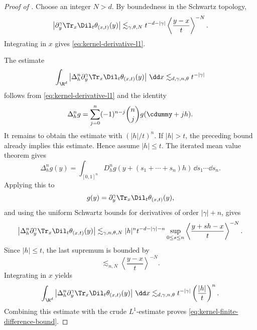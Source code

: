 \begin{proof}[Proof of ]
  Choose an integer \(N > d\). By boundedness in the Schwartz topology,
  \[
    \left|
      \partial_y^{\gamma}
      \Tr_x \Dil_t \theta_{(x, t)}(y)
    \right|
    \lesssim_{\gamma, \theta, N}
    t^{-d - |\gamma|}
    \left\langle \frac{y - x}{t} \right\rangle^{-N}.
  \]
  Integrating in \(x\) gives \eqref{eq:kernel-derivative-l1}.

  The estimate
  \[
    \int_{\R^d}
    \left|
      \Delta_h^n
      \partial_y^{\gamma}
      \Tr_x \Dil_t \theta_{(x, t)}(y)
    \right|
    \, \dd x
    \lesssim_{d, \gamma, n, \theta}
    t^{-|\gamma|}
  \]
  follows from \eqref{eq:kernel-derivative-l1} and the identity
  \[
    \Delta_h^n g
    =
    \sum_{j = 0}^n
    (-1)^{n - j}
    \binom{n}{j}
    g(\cdummy + jh).
  \]
  It remains to obtain the estimate with
  \((|h|/t)^n\). If \(|h| > t\), the preceding bound already implies this
  estimate. Hence assume \(|h| \le t\). The iterated mean value theorem gives
  \[
    \Delta_h^n g(y)
    =
    \int_{[0, 1]^n}
    D_h^n g(y + (s_1 + \cdots + s_n)h)
    \, \dd s_1 \cdots \dd s_n.
  \]
  Applying this to
  \[
    g(y) =
    \partial_y^{\gamma}
    \Tr_x \Dil_t \theta_{(x, t)}(y),
  \]
  and using the uniform Schwartz bounds for derivatives of order
  \(|\gamma| + n\), gives
  \[
    \left|
      \Delta_h^n
      \partial_y^{\gamma}
      \Tr_x \Dil_t \theta_{(x, t)}(y)
    \right|
    \lesssim_{\gamma, n, \theta, N}
    |h|^n t^{-d - |\gamma| - n}
    \sup_{0 \le s \le n}
    \left\langle
      \frac{y + sh - x}{t}
    \right\rangle^{-N}.
  \]
  Since \(|h| \le t\), the last supremum is bounded by
  \[
    \lesssim_{n, N}
    \left\langle \frac{y - x}{t} \right\rangle^{-N}.
  \]
  Integrating in \(x\) yields
  \[
    \int_{\R^d}
    \left|
      \Delta_h^n
      \partial_y^{\gamma}
      \Tr_x \Dil_t \theta_{(x, t)}(y)
    \right|
    \, \dd x
    \lesssim_{d, \gamma, n, \theta}
    t^{-|\gamma|}
    \left(\frac{|h|}{t}\right)^n.
  \]
  Combining this estimate with the crude \(L^1\)-estimate proves
  \eqref{eq:kernel-finite-difference-bound}.
\end{proof}

